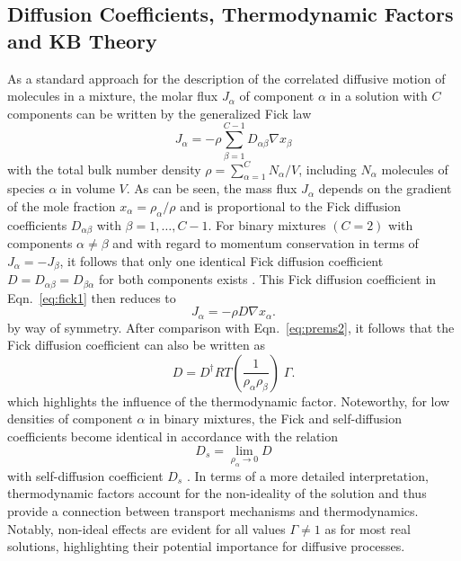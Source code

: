 \documentclass[aip,jcp,reprint]{revtex4-1}
\begin{document}
\subsection{Diffusion Coefficients, Thermodynamic Factors and KB Theory}
As a standard approach for  the description  of the correlated diffusive motion of molecules in a mixture, the molar flux $J_{\alpha}$ of component $\alpha$ in a solution with $C$ components can be written by the generalized Fick law \cite{liu13a,bird04a}
\begin{equation}
 \label{eq:fick1}
 J_{\alpha}=- \rho \sum_{\beta=1}^{C-1} D_{\alpha\beta} \nabla x_{\beta}
\end{equation}
with the total bulk number density $\rho=\sum_{\alpha=1}^CN_{\alpha}/V$, including $N_{\alpha}$ molecules of species $\alpha$ in volume $V$. As can be seen, the mass flux $J_{\alpha}$ depends on the gradient of  the mole fraction $x_{\alpha}=\rho_{\alpha}/\rho$ and is proportional to the Fick  diffusion coefficients $D_{\alpha\beta}$ with $\beta=1,\ldots,C-1$.
For binary mixtures $(C=2)$ with components $\alpha\neq \beta$ and with regard to momentum conservation in terms of  $J_{\alpha} = - J_{\beta}$,  it follows that only one identical Fick diffusion coefficient $D=D_{\alpha\beta}=D_{\beta\alpha}$ for both components exists \cite{liu13a,taylor93a,newman12a}. This Fick diffusion coefficient in Eqn.~\eqref{eq:fick1} then reduces to
\begin{equation}
 \label{eq:fickbin}
 J_{\alpha}= -\rho D \nabla x_{\alpha}.
\end{equation}
by way of symmetry. After comparison with Eqn.~\eqref{eq:prems2}, it follows that the Fick diffusion coefficient can also be written as 
\begin{equation}
\label{eq:ident}
D = D^{\dag}RT\left(\frac{1}{\rho_{\alpha}\rho_{\beta}}\right)\;\Gamma.
\end{equation}
which highlights the influence of the thermodynamic factor. 
Noteworthy, for low densities of component $\alpha$ in binary mixtures, the Fick and self-diffusion coefficients become identical  in accordance with the relation\cite{liu13a}  
\begin{equation} 
\label{eq:equiv}
D_s = \lim_{\rho_{\alpha}\rightarrow 0}D
\end{equation}
with self-diffusion coefficient $D_{s}$ \cite{bardow15a,liu11a,liu13a}. 
In terms of a more detailed interpretation, thermodynamic factors account for the non-ideality of the solution and thus provide a connection between transport mechanisms and thermodynamics. Notably, non-ideal effects are evident for all values $\Gamma \neq 1$ as for most real solutions, highlighting their potential importance for diffusive processes.
\end{document}
